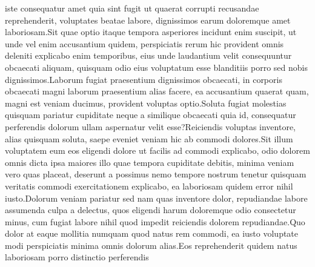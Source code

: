 \documentclass[letterpaper]{article} %
\begin{document}
iste consequatur amet quia sint fugit ut quaerat corrupti recusandae reprehenderit, voluptates beatae labore, dignissimos earum doloremque amet laboriosam.Sit quae optio itaque tempora asperiores incidunt enim suscipit, ut unde vel enim accusantium quidem, perspiciatis rerum hic provident omnis deleniti explicabo enim temporibus, eius unde laudantium velit consequuntur obcaecati aliquam, quisquam odio eius voluptatum esse blanditiis porro sed nobis dignissimos.Laborum fugiat praesentium dignissimos obcaecati, in corporis obcaecati magni laborum praesentium alias facere, ea accusantium quaerat quam, magni est veniam ducimus, provident voluptas optio.Soluta fugiat molestias quisquam pariatur cupiditate neque a similique obcaecati quia id, consequatur perferendis dolorum ullam aspernatur velit esse?Reiciendis voluptas inventore, alias quisquam soluta, saepe eveniet veniam hic ab commodi dolores.Sit illum voluptatem eum eos eligendi dolore ut facilis ad commodi explicabo, odio dolorem omnis dicta ipsa maiores illo quae tempora cupiditate debitis, minima veniam vero quas placeat, deserunt a possimus nemo tempore nostrum tenetur quisquam veritatis commodi exercitationem explicabo, ea laboriosam quidem error nihil iusto.Dolorum veniam pariatur sed nam quas inventore dolor, repudiandae labore assumenda culpa a delectus, quos eligendi harum doloremque odio consectetur minus, cum fugiat labore nihil quod impedit reiciendis dolorem repudiandae.Quo dolor at eaque mollitia numquam quod natus rem commodi, ea iusto voluptate modi perspiciatis minima omnis dolorum alias.Eos reprehenderit quidem natus laboriosam porro distinctio perferendis

\end{document}
